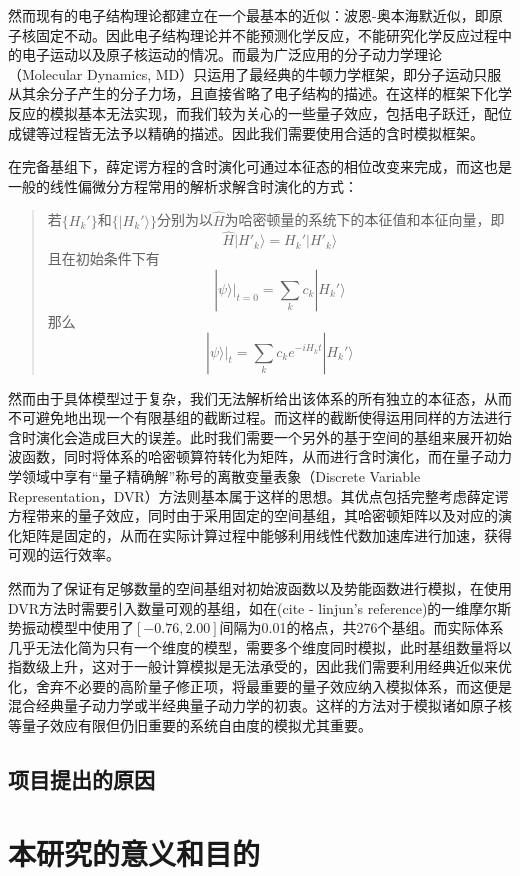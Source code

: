 然而现有的电子结构理论都建立在一个最基本的近似：波恩-奥本海默近似，即原子核固定不动。因此电子结构理论并不能预测化学反应，不能研究化学反应过程中的电子运动以及原子核运动的情况。而最为广泛应用的分子动力学理论（Molecular Dynamics, MD）只运用了最经典的牛顿力学框架，即分子运动只服从其余分子产生的分子力场，且直接省略了电子结构的描述。在这样的框架下化学反应的模拟基本无法实现，而我们较为关心的一些量子效应，包括电子跃迁，配位成键等过程皆无法予以精确的描述。因此我们需要使用合适的含时模拟框架。

在完备基组下，薛定谔方程的含时演化可通过本征态的相位改变来完成，而这也是一般的线性偏微分方程常用的解析求解含时演化的方式\cite{courant2008methods}：

\begin{quote}
若$\{H_k'\}$和$\{|H_k'\rangle\}$分别为以$\hat{H}$为哈密顿量的系统下的本征值和本征向量，即
\begin{equation}
	\hat{H} |H'_k\rangle = H_k' |H'_k\rangle
\end{equation}
且在初始条件下有
\begin{equation}
	|\psi \rangle\big|_{t=0} = \sum_k c_k |H_k'\rangle
\end{equation}
那么
\begin{equation}
	|\psi \rangle\big|_{t} = \sum_k c_k e^{-iH_k t}|H_k'\rangle
\end{equation}
\end{quote}

然而由于具体模型过于复杂，我们无法解析给出该体系的所有独立的本征态，从而不可避免地出现一个有限基组的截断过程。而这样的截断使得运用同样的方法进行含时演化会造成巨大的误差。此时我们需要一个另外的基于空间的基组来展开初始波函数，同时将体系的哈密顿算符转化为矩阵，从而进行含时演化，而在量子动力学领域中享有``量子精确解''称号的离散变量表象（Discrete Variable Representation，DVR）方法则基本属于这样的思想\cite{colbert1992novel}。其优点包括完整考虑薛定谔方程带来的量子效应，同时由于采用固定的空间基组，其哈密顿矩阵以及对应的演化矩阵是固定的，从而在实际计算过程中能够利用线性代数加速库进行加速，获得可观的运行效率。

然而为了保证有足够数量的空间基组对初始波函数以及势能函数进行模拟，在使用DVR方法时需要引入数量可观的基组，如在(cite - linjun's reference)的一维摩尔斯势振动模型中使用了$[-0.76,2.00]$间隔为0.01的格点，共276个基组。而实际体系几乎无法化简为只有一个维度的模型，需要多个维度同时模拟，此时基组数量将以指数级上升，这对于一般计算模拟是无法承受的，因此我们需要利用经典近似来优化，舍弃不必要的高阶量子修正项，将最重要的量子效应纳入模拟体系，而这便是混合经典量子动力学或半经典量子动力学的初衷。这样的方法对于模拟诸如原子核等量子效应有限但仍旧重要的系统自由度的模拟尤其重要。


\subsection{项目提出的原因}

\section{本研究的意义和目的}
